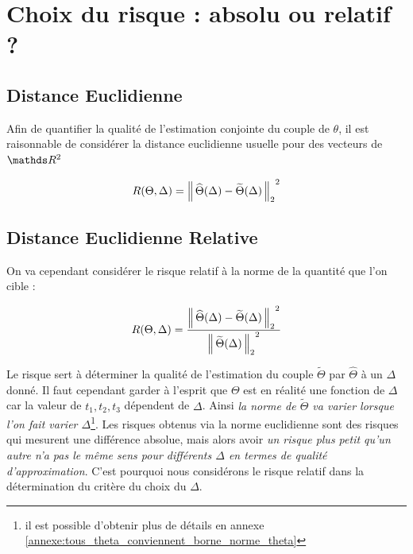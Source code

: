 \section{Choix du risque : absolu ou relatif ?}
\label{annexe:choix-du-rique}

\subsection{Distance Euclidienne}

Afin de quantifier la qualité de l'estimation conjointe du couple de $\theta$, il est raisonnable de considérer la distance euclidienne usuelle pour des vecteurs de $\R 2$

\begin{equation*}
	R(\Theta, \Delta) = {\distnorme 2 {\widehat \Theta(\Delta)} {\widetilde \Theta(\Delta)}}^2
\end{equation*}


\subsection{Distance Euclidienne Relative}

On va cependant considérer le risque relatif à la norme de la quantité que l'on cible :

\begin{equation*}
	R(\Theta, \Delta) =\frac{ {\distnorme 2 {\widehat \Theta(\Delta)} {\widetilde \Theta(\Delta)}}^2}{ {\norme 2 {\widetilde \Theta(\Delta)}}^2 }
\end{equation*}


Le risque sert à déterminer la qualité de l'estimation du couple $\widetilde \Theta$ par $\widehat \Theta$ à un $\Delta$ donné. Il faut cependant garder à l'esprit que $\Theta$ est en réalité une fonction de $\Delta$ car la valeur de $t_1, t_2, t_3$ dépendent de $\Delta$. Ainsi \emph{la norme de $\widetilde \Theta$ va varier lorsque l'on fait varier $\Delta$}\footnote{il est possible d'obtenir plus de détails en annexe \ref{annexe:tous_theta_conviennent_borne_norme_theta}}. Les risques obtenus via la norme euclidienne sont des risques qui mesurent une différence absolue, mais alors avoir \emph{un risque plus petit qu'un autre n'a pas le même sens pour différents $\Delta$ en termes de qualité d'approximation}. C'est pourquoi nous considérons le risque relatif dans la détermination du critère du choix du $\Delta$.

